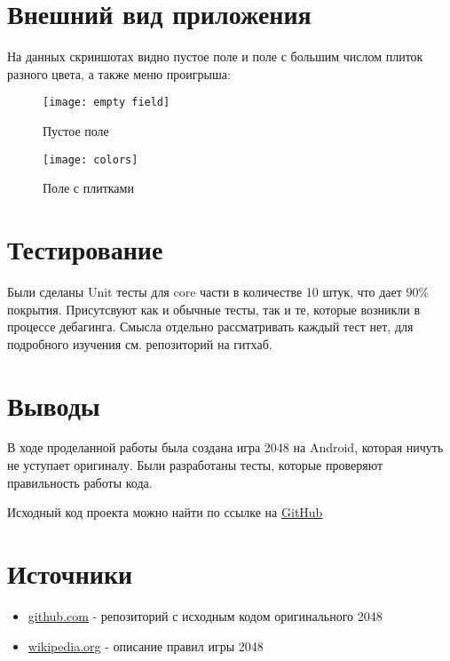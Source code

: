 \section{Внешний вид приложения}
На данных скриншотах видно пустое поле и поле с большим числом плиток разного цвета, а также меню проигрыша:

\begin{figure}[h]
	\begin{center}
		\begin{minipage}[h]{0.4\linewidth}
			\texttt{[image: empty field]}
			\caption{Пустое поле} %
			\label{fig:emptyField} %
		\end{minipage}
		\hfill
		\begin{minipage}[h]{0.4\linewidth}
			\texttt{[image: colors]}
			\caption{Поле с плитками}
			\label{ris:colors}
		\end{minipage}
	\end{center}
\end{figure}

\section{Тестирование}
Были сделаны Unit тесты для core части в количестве 10 штук, что дает 90\% покрытия. Присутсвуют как и обычные тесты, так и те, которые возникли в процессе дебагинга. Смысла отдельно рассматривать каждый тест нет, для подробного изучения см. репозиторий на гитхаб.


\section{Выводы}
В ходе проделанной работы была создана игра 2048 на Android, которая ничуть не уступает оригиналу. Были разработаны тесты, которые проверяют правильность работы кода.

Исходный код проекта можно найти по ссылке на \underline{\href{https://github.com/DafterT/ProgrammingLabSummer2022Task3}{GitHub}}

\section{Источники}

\begin{itemize}
\item \href{https://github.com/gabrielecirulli/2048}{\underline{github.com}} - репозиторий с исходным кодом оригинального 2048
\item \href{https://ru.wikipedia.org/wiki/2048\_(%D0%B8%D0%B3%D1%80%D0%B0)}{\underline{wikipedia.org}} - описание правил игры 2048
\end{itemize}

